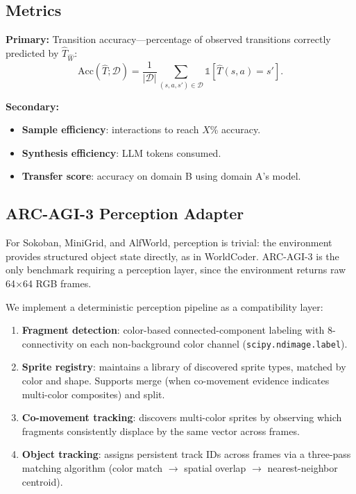 \documentclass{article}
\newcommand{\calD}{\mathcal{D}}
\newcommand{\ind}{\mathbb{1}}
\begin{document}
\subsection{Metrics}
\label{sec:metrics}

\textbf{Primary:} Transition accuracy---percentage of observed transitions
correctly predicted by $\hat{T}_{\hat{W}}$:
\begin{equation}
    \text{Acc}(\hat{T}; \calD) = \frac{1}{|\calD|}
        \sum_{(s,a,s') \in \calD} \ind[\hat{T}(s, a) = s'].
\end{equation}

\textbf{Secondary:}
\begin{itemize}[nosep]
    \item \textbf{Sample efficiency}: interactions to reach $X$\% accuracy.
    \item \textbf{Synthesis efficiency}: LLM tokens consumed.
    \item \textbf{Transfer score}: accuracy on domain B using domain A's model.
\end{itemize}

\subsection{ARC-AGI-3 Perception Adapter}
\label{sec:arc_perception}

For Sokoban, MiniGrid, and AlfWorld, perception is trivial: the environment
provides structured object state directly, as in WorldCoder.  ARC-AGI-3 is
the only benchmark requiring a perception layer, since the environment returns
raw 64$\times$64 RGB frames.

We implement a deterministic perception pipeline as a compatibility layer:
\begin{enumerate}[nosep]
    \item \textbf{Fragment detection}: color-based connected-component labeling
          with 8-connectivity on each non-background color channel
          (\texttt{scipy.ndimage.label}).
    \item \textbf{Sprite registry}: maintains a library of discovered sprite
          types, matched by color and shape.  Supports merge (when co-movement
          evidence indicates multi-color composites) and split.
    \item \textbf{Co-movement tracking}: discovers multi-color sprites by
          observing which fragments consistently displace by the same vector
          across frames.
    \item \textbf{Object tracking}: assigns persistent track IDs across frames
          via a three-pass matching algorithm (color match $\to$ spatial overlap
          $\to$ nearest-neighbor centroid).
\end{enumerate}
\end{document}
